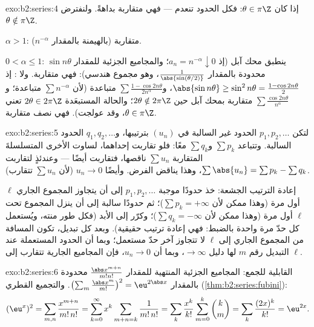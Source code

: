 \begin{solution}{exo:b2:series:4}
إذا كان $\theta \in \pi\Z$: فكل الحدود تنعدم --- فهي متقاربة بداهةً.
ولنفترض $\theta \notin \pi\Z$.

$\alpha > 1$: متقاربة  (بالهيمنة بالمقدار $n^{-\alpha}$).

$0 < \alpha \leq 1$: ينطبق محك آبل (إذ $a_n = n^{-\alpha}
\downarrow 0$؛ والمجاميع الجزئية للمقدار $\sin n\theta$ محدودة بالمقدار
$\frac{1}{\abs{\sin(\theta/2)}}$، وهو مجموع هندسي): فهي متقاربة. ولا
: إذ $\abs{\sin n\theta} \geq \sin^2 n\theta = \frac{1 -
\cos 2n\theta}{2}$، و$\sum \frac{1 - \cos 2n\theta}{2n^\alpha}$
متباعدة (لأن $\sum n^{-\alpha}$ متباعدة؛ و$\sum
\frac{\cos 2n\theta}{n^\alpha}$ متقاربة بمحك آبل حين $2\theta
\notin 2\pi\Z$؛ والحالة المستبعَدة $2\theta \in 2\pi\Z$ تعني
$\theta \in \pi\Z$، وقد عولجت). فهي نصف متقاربة.
\end{solution}

\begin{solution}{exo:b2:series:5}
لتكن $p_1, p_2, \dots$ الحدود غير السالبة في $(u_n)$ بترتيبها،
و$q_1, q_2, \dots$ الحدود السالبة. وتتباعد $\sum p_k$ و$\sum
q_k$ معًا: فلو تقاربت إحداهما، لساوت الأخرى
المتسلسلةَ المتقاربة $\sum u_n$ ناقصها، فتقاربت أيضًا --- وعندئذٍ
لتقاربت $\sum \abs{u_n} = \sum p_k - \sum q_k$، وهذا يناقض
الفرض. وأيضًا $u_n \to 0$ (لأن $\sum u_n$ تتقارب).

إعادة الترتيب الجشعة: خذ حدودًا موجبة $p_1, p_2, \dots$ إلى أن
يتجاوز المجموع الجاري $\ell$ أول مرة (وهذا ممكن لأن $\sum p_k =
+\infty$)؛ ثم حدودًا سالبة إلى أن ينزل المجموع تحت
$\ell$ أول مرة (وهذا ممكن لأن $\sum q_k = -\infty$)؛ وكرّر إلى الأبد (فكل
طور منته، ويُستعمل كل حدّ مرة واحدة بالضبط: فهي إعادة ترتيب
حقيقية). وبعد كل تبديل، تكون المسافة من المجموع الجاري
إلى $\ell$ لا تتجاوز آخر حدّ مستعمل؛ وبما أن الحدود المستعملة
عند التبديل رقم $m$ لها دليل $\to \infty$، وبما أن $u_n \to 0$،
فإن المجاميع الجارية تتقارب إلى $\ell$.
\end{solution}

\begin{solution}{exo:b2:series:6}
القابلية للجمع: المجاميع الجزئية المنتهية للمقدار
$\frac{\abs x^{m+n}}{m!n!}$ محدودة بالمقدار $\bigl(\sum_m
\frac{\abs x^m}{m!}\bigr)^2 = \eu^{2\abs x}$. والتجميع القطري
(\cref{thm:b2:series:fubini}):
\[
(\eu^{x})^2 = \sum_{m,n} \frac{x^{m+n}}{m!\,n!}
= \sum_{k=0}^{\infty} x^k \sum_{m+n=k} \frac{1}{m!\,n!}
= \sum_k \frac{x^k}{k!}\sum_{m=0}^{k}\binom km
= \sum_k \frac{(2x)^k}{k!} = \eu^{2x} .
\]
\end{solution}


